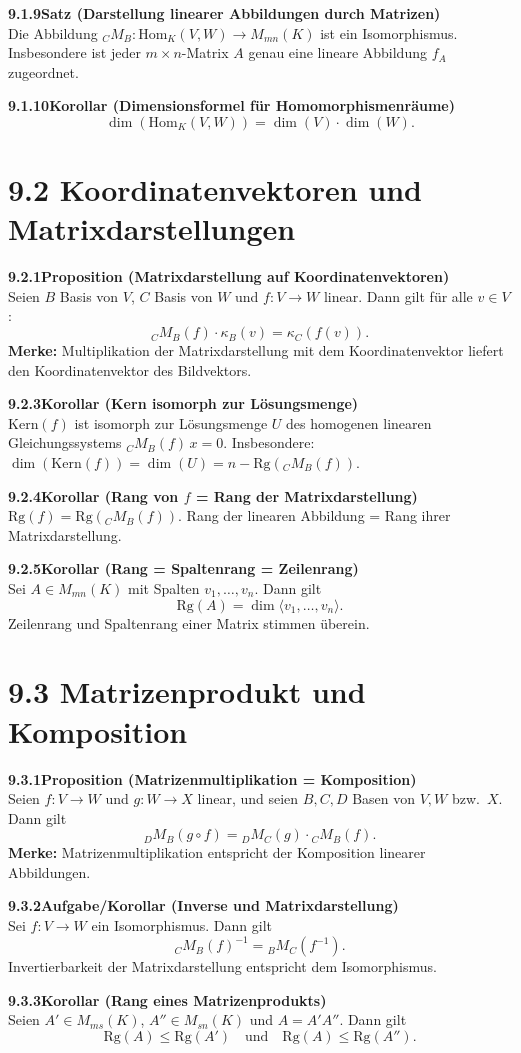 \documentclass[a4paper,12pt]{article}
\newcommand{\gentry}[3]{%
  \noindent\textbf{#1\quad #2}\nopagebreak\\[0.2em]
  #3\par\smallskip
}
\begin{document}
\gentry{9.1.9}{Satz (Darstellung linearer Abbildungen durch Matrizen)}{%
  Die Abbildung ${}_C M_B: \mathrm{Hom}_K(V,W) \to M_{mn}(K)$ ist ein
  Isomorphismus. Insbesondere ist jeder $m \times n$-Matrix $A$ genau eine
  lineare Abbildung $f_A$ zugeordnet.
}

\gentry{9.1.10}{Korollar (Dimensionsformel für Homomorphismenräume)}{%
  \[
    \dim(\mathrm{Hom}_K(V,W)) = \dim(V) \cdot \dim(W).
  \]
}

\section*{9.2 \quad Koordinatenvektoren und Matrixdarstellungen}

\gentry{9.2.1}{Proposition (Matrixdarstellung auf Koordinatenvektoren)}{%
  Seien $B$ Basis von $V$, $C$ Basis von $W$ und $f: V \to W$ linear.
  Dann gilt für alle $v \in V$:
  \[
    {}_C M_B(f) \cdot \kappa_B(v) = \kappa_C(f(v)).
  \]
  \textbf{Merke:} Multiplikation der Matrixdarstellung mit dem Koordinatenvektor
  liefert den Koordinatenvektor des Bildvektors.
}

\gentry{9.2.3}{Korollar (Kern isomorph zur Lösungsmenge)}{%
  $\mathrm{Kern}(f)$ ist isomorph zur Lösungsmenge $U$ des homogenen linearen
  Gleichungssystems ${}_C M_B(f)\,x = 0$. Insbesondere:
  $\dim(\mathrm{Kern}(f)) = \dim(U) = n - \mathrm{Rg}({}_C M_B(f))$.
}

\gentry{9.2.4}{Korollar (Rang von $f$ = Rang der Matrixdarstellung)}{%
  $\mathrm{Rg}(f) = \mathrm{Rg}({}_C M_B(f))$.
  Rang der linearen Abbildung = Rang ihrer Matrixdarstellung.
}

\gentry{9.2.5}{Korollar (Rang = Spaltenrang = Zeilenrang)}{%
  Sei $A \in M_{mn}(K)$ mit Spalten $v_1,\ldots,v_n$. Dann gilt
  \[
    \mathrm{Rg}(A) = \dim\langle v_1,\ldots,v_n \rangle.
  \]
  Zeilenrang und Spaltenrang einer Matrix stimmen überein.
}

\section*{9.3 \quad Matrizenprodukt und Komposition}

\gentry{9.3.1}{Proposition (Matrizenmultiplikation = Komposition)}{%
  Seien $f: V \to W$ und $g: W \to X$ linear, und seien $B, C, D$ Basen von
  $V, W$ bzw.\ $X$. Dann gilt
  \[
    {}_D M_B(g \circ f) = {}_D M_C(g) \cdot {}_C M_B(f).
  \]
  \textbf{Merke:} Matrizenmultiplikation entspricht der Komposition linearer
  Abbildungen.
}

\gentry{9.3.2}{Aufgabe/Korollar (Inverse und Matrixdarstellung)}{%
  Sei $f: V \to W$ ein Isomorphismus. Dann gilt
  \[
    {}_C M_B(f)^{-1} = {}_B M_C(f^{-1}).
  \]
  Invertierbarkeit der Matrixdarstellung entspricht dem Isomorphismus.
}

\gentry{9.3.3}{Korollar (Rang eines Matrizenprodukts)}{%
  Seien $A' \in M_{ms}(K)$, $A'' \in M_{sn}(K)$ und $A = A'A''$. Dann gilt
  \[
    \mathrm{Rg}(A) \le \mathrm{Rg}(A') \quad\text{und}\quad
    \mathrm{Rg}(A) \le \mathrm{Rg}(A'').
  \]
}
\end{document}
